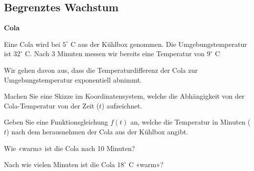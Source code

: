 
\subsection{Begrenztes Wachstum}


\bbwActAufgabenNr{} \textbf{Cola}

Eine Cola wird bei $5^\circ \textrm{ C}$ aus der Kühlbox genommen. Die
Umgebungstemperatur ist $32^\circ \textrm{ C}$. Nach 3 Minuten messen
wir bereits eine Temperatur von $9^\circ \textrm{ C}$ 

Wir gehen davon aus, dass die Temperaturdifferenz der Cola zur
Umgebungstemperatur exponentiell abnimmt.

\begin{bbwAufgabenBlock}
\item Machen Sie eine Skizze im Koordinatensystem, welche die
Abhängigkeit von der Cola-Temperatur von der Zeit ($t$) aufzeichnet.


\item Geben Sie eine Funktionsgleichung $f(t)$ an, welche die
Temperatur in Minuten ($t$) nach dem herausnehmen der Cola aus der Kühlbox
angibt.


\item Wie «warm» ist die Cola nach 10 Minuten?


\item Nach wie vielen Minuten ist die Cola $18^\circ \textrm{ C}$
«warm»?


\end{bbwAufgabenBlock}


\platzFuerBerechnungenBisEndeSeite{}




